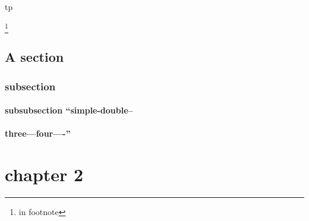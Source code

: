 \documentclass{book}
\begin{document}
tp
\printindex[tp]



\footnote{in footnote}


\section{A section}
\label{anchor:s_002d_002dect_002cion}%


\subsection{subsection}
\label{anchor:subsection}%


\label{anchor:anchor}%

\subsubsection{subsubsection ``simple-double--}
\label{anchor:subsubsection-_0060_0060simple_002ddouble_002d_002d}%

\subsubsection{three---four----''}
\label{anchor:subsubsection-three_002d_002d_002dfour_002d_002d_002d_002d_0027_0027}%

\chapter*{\centering chapter 2}
\label{anchor:chapter2}%

\printindex[cp]
\printindex[fn]
\end{document}
